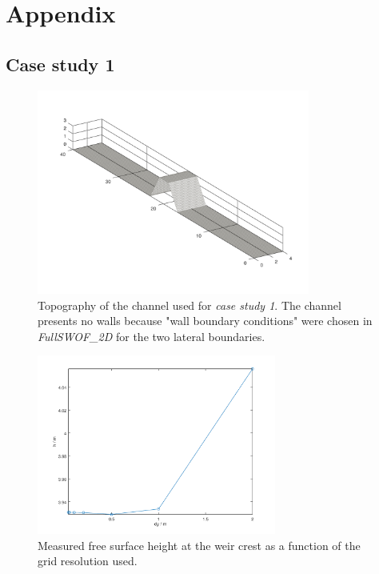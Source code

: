 \chapter{Appendix}




\section{Case study 1}
\begin{figure}[H]
  \centering
  \includegraphics[width=0.8\textwidth]{Figures/channel.png}
  \caption{Topography of the channel used for \emph{case study 1}. The channel presents no walls because "wall boundary conditions" were chosen in \textit{FullSWOF\_2D} for the two lateral boundaries.}
  \label{fig:channel}
\end{figure}


\begin{figure}[H]
  \centering
  \includegraphics[width=0.7\textwidth]{Figures/convergence_center.png}
  \caption{Measured free surface height at the weir crest as a function of the grid resolution used.}
  \label{fig:convergence_center}
\end{figure}


